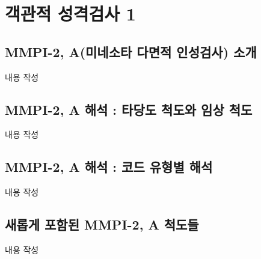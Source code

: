 \section{객관적 성격검사 1}

\subsection{MMPI-2, A(미네소타 다면적 인성검사) 소개}
내용 작성

\subsection{MMPI-2, A 해석 : 타당도 척도와 임상 척도}
내용 작성

\subsection{MMPI-2, A 해석 : 코드 유형별 해석}
내용 작성

\subsection{새롭게 포함된 MMPI-2, A 척도들}
내용 작성
